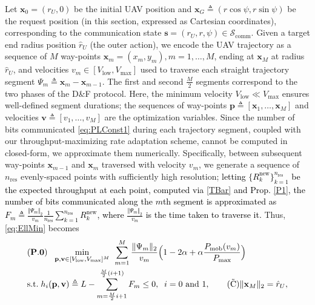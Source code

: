 \documentclass[12pt, draftcls, onecolumn]{IEEEtran}
\theoremstyle{plain}
\theoremstyle{definition}
\theoremstyle{remark}
\newcommand\hlt[1]{\textcolor{black}{#1}}
\begin{document}
Let $\mathbf x_0=(r_U,0)$ be the initial UAV position and $\mathbf{x}_G{\triangleq}(r\cos{\psi},r\sin{\psi})$ be the request position (in this section, expressed as Cartesian coordinates), corresponding to the communication state $\mathbf{s}{=}(r_{U},r,\psi){\in}\mathcal{S}_{\mathrm{comm}}$. Given a target end radius position $\hat{r}_{U}$ (the outer action), we encode the UAV trajectory as a sequence of $M$ way-points $\mathbf{x}_{m}{=}(x_{m},y_{m}),m=1,\dots,M$, ending at $\mathbf{x}_{M}$ at radius $\hat r_U$, and velocities $v_{m}{\in}[V_{\mathrm{low}},V_{\mathrm{max}}]$ used to traverse each straight trajectory segment $\Psi_{m}{\triangleq}\mathbf{x}_{m}{-}\mathbf{x}_{m{-}1}$. The first and second $\frac{M}{2}$ segments correspond to the two phases of the D\&F protocol. Here, the minimum velocity $V_{\mathrm{low}}{\ll}V_{\mathrm{max}}$  ensures well-defined segment durations; the sequences of way-points $\mathbf{p}{\triangleq}[\mathbf{x}_{1},{\dots},\mathbf{x}_{M}]$ and velocities $\mathbf{v}{\triangleq}[v_{1},{\dots},v_{M}]$ are the optimization variables. Since the number of bits communicated \eqref{eq:PLConst1} during each trajectory segment, coupled with our throughput-maximizing rate adaptation scheme, cannot be computed in closed-form, we approximate them numerically. Specifically, between subsequent way-points $\mathbf{x}_{m-1}$ and $\mathbf{x}_{m}$ traversed with velocity $v_{m}$, we generate a sequence of $n_{\mathrm{res}}$ evenly-spaced points with sufficiently high resolution; \hlt{letting $\{R_{k}^{\mathrm{new}}\}_{k{=}1}^{n_{\mathrm{res}}}$ be the expected throughput at each point,
computed via \eqref{TBar} and Prop. \ref{P1}, the number of bits communicated along the $m$th segment is approximated as $F_{m}{\triangleq}\frac{\Vert\Psi_{m}\Vert_2}{v_m}\frac{1}{n_{\mathrm{res}}}\sum_{k{=}1}^{n_{\mathrm{res}}}R_{k}^{\mathrm{new}}$, where $\frac{\Vert\Psi_{m}\Vert_{2}}{v_{m}}$ is the time taken to traverse it.} Thus, \eqref{eq:EllMin} becomes
\begin{align}
    &(\mathbf{P.0})\;\;\; \underset{\mathbf p,\mathbf v{\in}[V_{\mathrm{low}},V_{\mathrm{max}}]^M}{\mathrm{min}} \;\,  \sum_{m=1}^{M} \frac{\Vert \Psi_m \Vert_2}{v_m}\Big(1-2\alpha+\alpha \frac{P_{\mathrm{mob}}(v_m)}{P_{\max}}\Big) \label{eq:HeurMin}\\
    &\mathrm{s.t.}\; h_{i}(\mathbf p ,\mathbf v) \triangleq L - \sum_{m=\frac{M}{2}i+1}^{\frac{M}{2}(i+1)} F_{m} \leq 0, \;\; i = 0\text{ and }1,\label{eq:NewPLC}\tag{$\tilde{\text{C}}$}
    \Vert\mathbf x_M\Vert_2 = \hat{r}_U,
\end{align}
\end{document}
